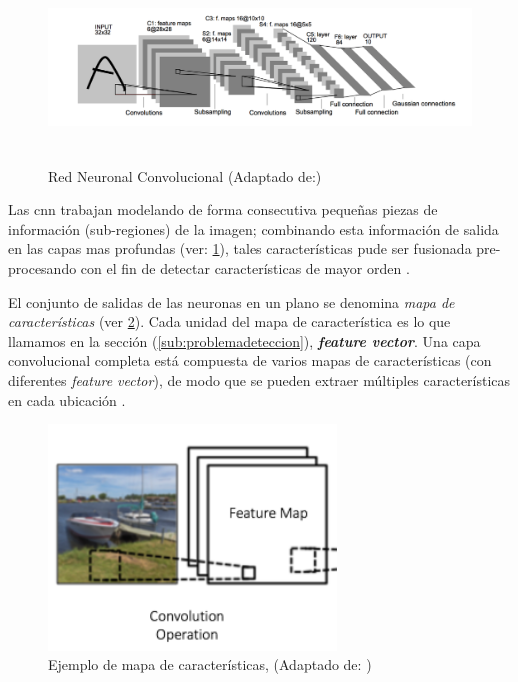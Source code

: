 \begin{figure}[h]
 \centering
  \includegraphics[height=5cm,keepaspectratio=true,clip=true]{imagenes/Logos/cnnconv.png}
  \caption{Red Neuronal Convolucional (Adaptado de:\citep{cnns})}
	\label{Fig: redconvolucion}
\end{figure}

Las \ac{cnn} trabajan modelando de forma consecutiva pequeñas piezas de información (sub-regiones) de la imagen; combinando esta información de salida en las capas mas profundas (ver: \ref{Fig: redconvolucion}), tales características pude ser fusionada pre-procesando con el fin de detectar características de mayor orden \citep{murphy}.


El conjunto de salidas de las neuronas en un plano se denomina \textit{mapa de características} (ver \ref{Fig: fmaps}). Cada unidad  del mapa de característica es lo que llamamos en la sección (\ref{sub:problemadeteccion}),  \textit{\textbf{feature vector}}. Una capa convolucional completa está compuesta de varios mapas de características (con diferentes 
\textit{feature vector}), de modo que se pueden extraer múltiples características en cada ubicación \citep{cnns}.

\begin{figure}[H]
 \centering
  \includegraphics[height=6cm,keepaspectratio=true,clip=true]{imagenes/Logos/fmaps.png}
  \caption{Ejemplo de mapa de características, (Adaptado de: \citep{cnnsarticle})}
	\label{Fig: fmaps}
\end{figure}

